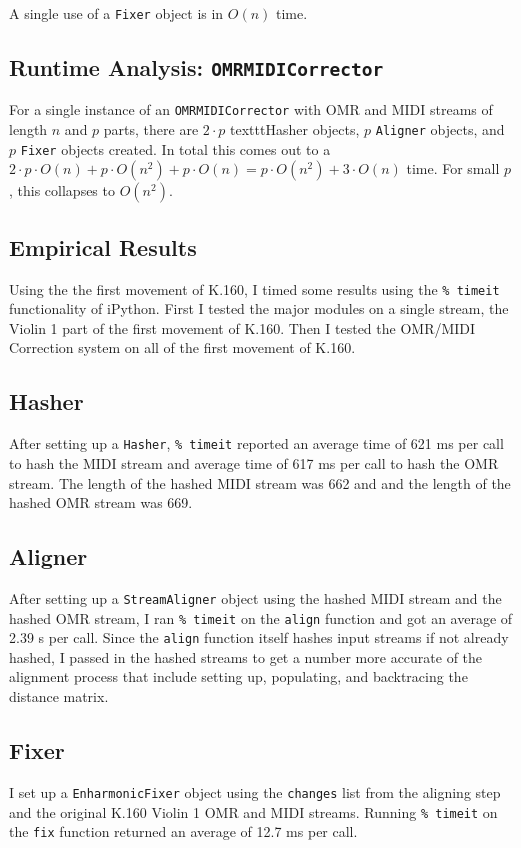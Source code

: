 A single use of a \texttt{Fixer} object is in $O(n)$ time. 

\subsection{Runtime Analysis: \texttt{OMRMIDICorrector}}
For a single instance of an \texttt{OMRMIDICorrector} with OMR and MIDI streams of length $n$ and $p$ parts, there are $2 \cdot p$ texttt{Hasher} objects, $p$ \texttt{Aligner} objects, and $p$ \texttt{Fixer} objects created. In total this comes out to a $2 \cdot p \cdot O(n) + p \cdot O(n^2) + p \cdot O(n) = p \cdot O(n^2) + 3 \cdot O(n)$ time. For small $p$, this collapses to $O(n^2)$. 
 
\subsection{Empirical Results}
Using the the first movement of K.160, I timed some results using the \texttt{\% timeit} functionality of iPython. First I tested the major modules on a single stream, the Violin 1 part of the first movement of K.160. Then I tested the OMR/MIDI Correction system on all of the first movement of K.160.

\subsection{Hasher}
After setting up a \texttt{Hasher}, \texttt{\% timeit}  reported an average time of 621 ms per call to hash the MIDI stream and average time of 617 ms per call to hash the OMR stream. The length of the hashed MIDI stream was 662 and and the length of the hashed OMR stream was 669. 

\subsection{Aligner}
After setting up a \texttt{StreamAligner} object using the hashed MIDI stream and the hashed OMR stream, I ran \texttt{\% timeit} on the \texttt{align} function and got an average of 2.39 s per call. Since the \texttt{align} function itself hashes input streams if not already hashed, I passed in the hashed streams to get a number more accurate of the alignment process that include setting up, populating, and backtracing the distance matrix. 

\subsection{Fixer}
I set up a \texttt{EnharmonicFixer} object using the \texttt{changes} list from the aligning step and the original K.160 Violin 1 OMR and MIDI streams. Running \texttt{\% timeit} on the \texttt{fix} function returned an average of 12.7 ms per call. 

